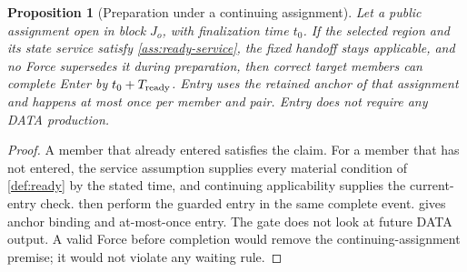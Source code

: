 \documentclass[11pt,a4paper]{article}
\newtheorem{proposition}[proposition]{Proposition}
\begin{document}
\begin{proposition}[Preparation under a continuing assignment]
\label{prop:ready-bound}
Let a public assignment open in block $J_o$, with finalization time
$t_0$. If the selected region and its state service satisfy
\cref{ass:ready-service}, the fixed handoff stays applicable, and no
Force supersedes it during preparation, then correct target members can
complete Enter by $t_0+T_{\rm ready}$. Entry uses the retained
anchor of that assignment and happens at most once per member and pair.
Entry does not require any DATA production.
\end{proposition}
\begin{proof}
A member that already entered satisfies the claim. For a member that has
not entered, the service assumption supplies every material condition of
\cref{def:ready} by the stated time, and continuing applicability
supplies the current-entry check.  then
perform the guarded entry in the same complete event.
 gives anchor binding and at-most-once
entry. The gate does not look at future DATA output. A valid Force before
completion would remove the continuing-assignment premise; it would not
violate any waiting rule.
\end{proof}
\end{document}
